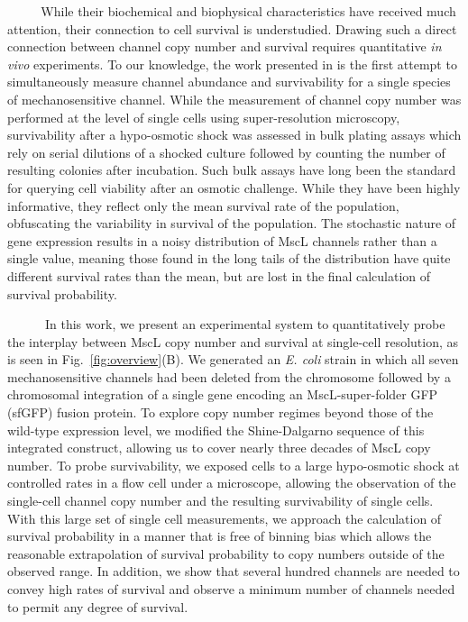 \documentclass[12pt]{caltech_thesis}
\begin{document}
~~~ ~ While their biochemical and biophysical characteristics have
received much attention, their connection to cell survival is
understudied. Drawing such a direct connection between channel copy
number and survival requires quantitative \emph{in vivo} experiments. To
our knowledge, the work presented in \autocite{vandenberg2016} is the
first attempt to simultaneously measure channel abundance and
survivability for a single species of mechanosensitive channel. While
the measurement of channel copy number was performed at the level of
single cells using super-resolution microscopy, survivability after a
hypo-osmotic shock was assessed in bulk plating assays which rely on
serial dilutions of a shocked culture followed by counting the number of
resulting colonies after incubation. Such bulk assays have long been the
standard for querying cell viability after an osmotic challenge. While
they have been highly informative, they reflect only the mean survival
rate of the population, obfuscating the variability in survival of the
population. The stochastic nature of gene expression results in a noisy
distribution of MscL channels rather than a single value, meaning those
found in the long tails of the distribution have quite different
survival rates than the mean, but are lost in the final calculation of
survival probability.

~ ~ ~ ~In this work, we present an experimental system to quantitatively
probe the interplay between MscL copy number and survival at single-cell
resolution, as is seen in Fig.~\ref{fig:overview}(B). We generated an
\emph{E. coli} strain in which all seven mechanosensitive channels had
been deleted from the chromosome followed by a chromosomal integration
of a single gene encoding an MscL-super-folder GFP (sfGFP) fusion
protein. To explore copy number regimes beyond those of the wild-type
expression level, we modified the Shine-Dalgarno sequence of this
integrated construct, allowing us to cover nearly three decades of MscL
copy number. To probe survivability, we exposed cells to a large
hypo-osmotic shock at controlled rates in a flow cell under a
microscope, allowing the observation of the single-cell channel copy
number and the resulting survivability of single cells. With this large
set of single cell measurements, we approach the calculation of survival
probability in a manner that is free of binning bias which allows the
reasonable extrapolation of survival probability to copy numbers outside
of the observed range. In addition, we show that several hundred
channels are needed to convey high rates of survival and observe a
minimum number of channels needed to permit any degree of survival.
\end{document}
